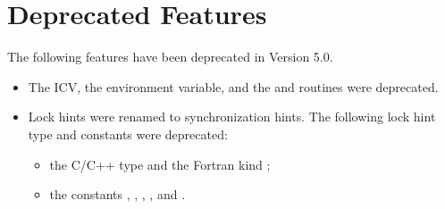 \section{Deprecated Features}
\label{chap:Deprecated Features}

The following features have been deprecated in Version 5.0.

\begin{itemize}
\item The  ICV, the  environment variable, and
      the  and  routines were deprecated.

\item Lock hints were renamed to synchronization hints. The following lock hint 
      type and constants were deprecated:

\begin{itemize}
\item the C/C++ type  and the Fortran kind
      ;

\item the constants ,
      , ,
      , and .
\end{itemize}
\end{itemize}


